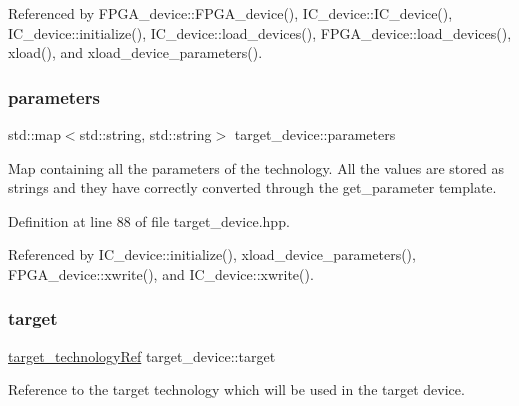 Referenced by F\+P\+G\+A\+\_\+device\+::\+F\+P\+G\+A\+\_\+device(), I\+C\+\_\+device\+::\+I\+C\+\_\+device(), I\+C\+\_\+device\+::initialize(), I\+C\+\_\+device\+::load\+\_\+devices(), F\+P\+G\+A\+\_\+device\+::load\+\_\+devices(), xload(), and xload\+\_\+device\+\_\+parameters().

\mbox{\label{classtarget__device_a37bac41e448c41385a9be771e4025ae2}} 
\subsubsection{\texorpdfstring{parameters}{parameters}}
{\footnotesize\ttfamily std\+::map$<$std\+::string, std\+::string$>$ target\+\_\+device\+::parameters\hspace{0.3cm}{\ttfamily [protected]}}



Map containing all the parameters of the technology. All the values are stored as strings and they have correctly converted through the get\+\_\+parameter template. 



Definition at line 88 of file target\+\_\+device.\+hpp.



Referenced by I\+C\+\_\+device\+::initialize(), xload\+\_\+device\+\_\+parameters(), F\+P\+G\+A\+\_\+device\+::xwrite(), and I\+C\+\_\+device\+::xwrite().

\mbox{\label{classtarget__device_a7b257760c9903566dc0f8260ee18a2eb}} 
\subsubsection{\texorpdfstring{target}{target}}
{\footnotesize\ttfamily \hyperlink{target__technology_8hpp_a16af97aadc4eb998c2c9ec7fba5ccecd}{target\+\_\+technology\+Ref} target\+\_\+device\+::target\hspace{0.3cm}{\ttfamily [protected]}}



Reference to the target technology which will be used in the target device. 



